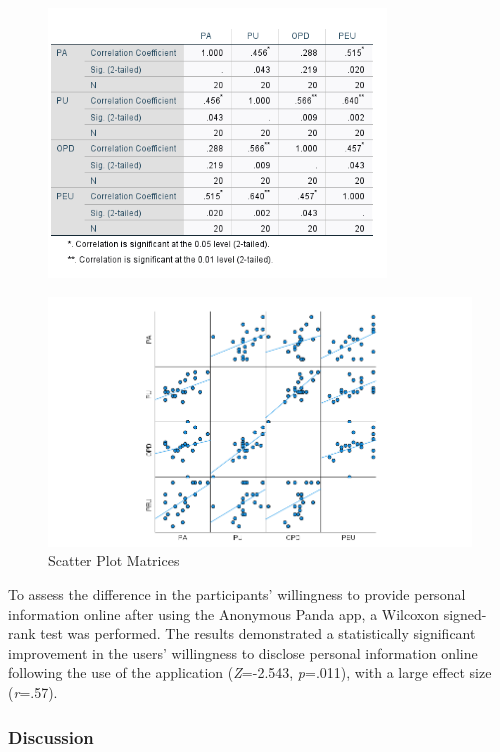 \begin{figure}[!htb]
\includegraphics[width=0.8\textwidth]{figures/altCorrelations.png}
\centering
{}
\label{fig:altcorrelations}
\end{figure}

\begin{figure}[!htb]
\includegraphics[width=\textwidth]{figures/scatterbox.png}
\centering
\caption{Scatter Plot Matrices}
\label{fig:scatterbox}
\end{figure}

To assess the difference in the participants' willingness to provide personal information online after using the Anonymous Panda app, a Wilcoxon signed-rank test was performed. The results demonstrated a statistically significant improvement in the users' willingness to disclose personal information online following the use of the application (\textit{Z}=-2.543, \textit{p}=.011), with a large effect size (\textit{r}=.57).
 
\subsubsection{Discussion}

